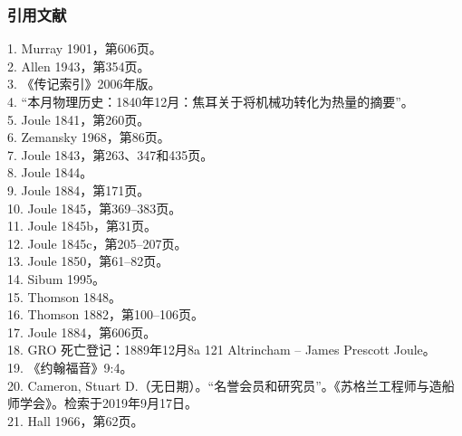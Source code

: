 \subsubsection{引用文献}
1. Murray 1901，第606页。\\
2. Allen 1943，第354页。\\ 
3. 《传记索引》2006年版。\\  
4. “本月物理历史：1840年12月：焦耳关于将机械功转化为热量的摘要”。\\  
5. Joule 1841，第260页。\\
6. Zemansky 1968，第86页。\\
7. Joule 1843，第263、347和435页。\\
8. Joule 1844。\\
9. Joule 1884，第171页。\\
10. Joule 1845，第369–383页。\\
11. Joule 1845b，第31页。\\ 
12. Joule 1845c，第205–207页。\\ 
13. Joule 1850，第61–82页。\\
14. Sibum 1995。\\
15. Thomson 1848。\\
16. Thomson 1882，第100–106页。\\
17. Joule 1884，第606页。\\
18. GRO 死亡登记：1889年12月8a 121 Altrincham – James Prescott Joule。\\
19. 《约翰福音》9:4。\\
20. Cameron, Stuart D.（无日期）。“名誉会员和研究员”。《苏格兰工程师与造船师学会》。检索于2019年9月17日。\\
21. Hall 1966，第62页。\\